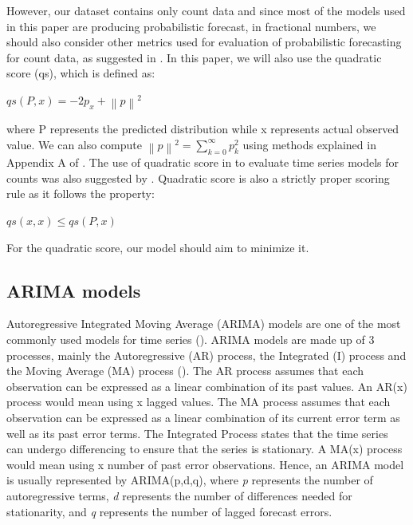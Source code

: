 \documentclass[nonblindrev,msom]{informs3} %
\begin{document}
\noindent However, our dataset contains only count data and since most of the models used in this paper are producing probabilistic forecast, in fractional numbers, we should also consider other metrics used for evaluation of probabilistic forecasting for count data, as suggested in \cite{Czado2009PredictiveMA}. In this paper, we will also use the quadratic score (qs), which is defined as:

\begin{center}
    $\displaystyle qs(P, x) = -2p_{x} + \left \| p \right \|^{2}$
\end{center}

\noindent where P represents the predicted distribution while x represents actual observed value. We can also compute $\left \| p \right \|^{2} = \sum_{k=0}^{\infty }p_{k}^{2}$ using methods explained in Appendix A of \cite{Czado2009PredictiveMA}. The use of quadratic score in to evaluate time series models for counts was also suggested by \cite{jstor}. Quadratic score is also a strictly proper scoring rule as it follows the property:

\begin{center}
    $\displaystyle qs(x, x) \leq qs(P, x)$
\end{center}

\noindent For the quadratic score, our model should aim to minimize it.


\subsection{ARIMA models}
Autoregressive Integrated Moving Average (ARIMA) models are one of the most commonly used models for time series (\cite{Asha2016}). ARIMA models are made up of 3 processes, mainly the Autoregressive (AR) process, the Integrated (I) process and the Moving Average (MA) process (\cite{Jamal2018}). The AR process assumes that each observation can be expressed as a linear combination of its past values.  An AR(x) process would mean using x lagged values. The MA process assumes that each observation can be expressed as a linear combination of its current error term as well as its past error terms. The Integrated Process states that the time series can undergo differencing to ensure that the series is stationary. A MA(x) process would mean using x number of past error observations. Hence, an ARIMA model is usually represented by ARIMA(p,d,q), where \textit{p} represents the number of autoregressive terms, \textit{d} represents the number of differences needed for stationarity, and \textit{q} represents the number of lagged forecast errors. 
\end{document}
